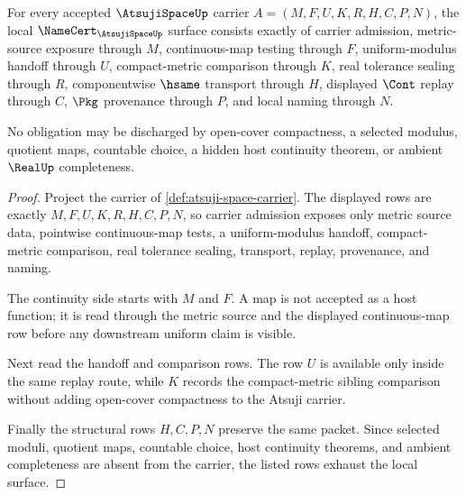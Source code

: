 \begin{theorem}
\label{thm:atsuji-space-namecert-obligations}
For every accepted $\AtsujiSpaceUp$ carrier $A=(M,F,U,K,R,H,C,P,N)$, the local $\NameCert_{\AtsujiSpaceUp}$ surface consists exactly of carrier admission, metric-source exposure through $M$, continuous-map testing through $F$, uniform-modulus handoff through $U$, compact-metric comparison through $K$, real tolerance sealing through $R$, componentwise $\hsame$ transport through $H$, displayed $\Cont$ replay through $C$, $\Pkg$ provenance through $P$, and local naming through $N$.

No obligation may be discharged by open-cover compactness, a selected modulus, quotient maps, countable choice, a hidden host continuity theorem, or ambient $\RealUp$ completeness.
\end{theorem}
\begin{proof}
Project the carrier of \autoref{def:atsuji-space-carrier}. The displayed rows are exactly $M,F,U,K,R,H,C,P,N$, so carrier admission exposes only metric source data, pointwise continuous-map tests, a uniform-modulus handoff, compact-metric comparison, real tolerance sealing, transport, replay, provenance, and naming.

The continuity side starts with $M$ and $F$. A map is not accepted as a host function; it is read through the metric source and the displayed continuous-map row before any downstream uniform claim is visible.

Next read the handoff and comparison rows. The row $U$ is available only inside the same replay route, while $K$ records the compact-metric sibling comparison without adding open-cover compactness to the Atsuji carrier.

Finally the structural rows $H,C,P,N$ preserve the same packet. Since selected moduli, quotient maps, countable choice, host continuity theorems, and ambient completeness are absent from the carrier, the listed rows exhaust the local surface.
\end{proof}

